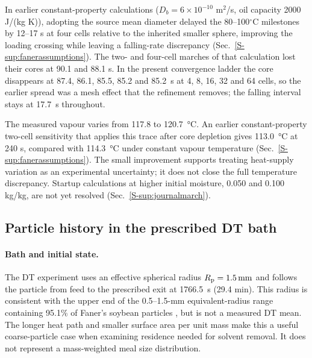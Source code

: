 In earlier constant-property calculations ($D_b=6\times10^{-10}$ m$^2$/s,
oil capacity 2000 J/(kg K)), adopting the source mean diameter delayed the
80--100$^\circ$C milestones by 12--17 s at four cells relative to the
inherited smaller sphere, improving the loading crossing while leaving a
falling-rate discrepancy (Sec.~\ref*{S-sup:fanerassumptions}). The
two- and four-cell marches of that calculation lost their cores at 90.1
and 88.1 s. In the present convergence ladder the core disappears at 87.4, 86.1, 85.5, 85.2 and 85.2~s at 4, 8,
16, 32 and 64 cells, so the earlier spread was a mesh effect that the
refinement removes; the falling interval stays at 17.7~s throughout.

The measured vapour varies from 117.8 to \SI{120.7}{\celsius}. An earlier
constant-property two-cell sensitivity that applies this trace after core
depletion gives \SI{113.0}{\celsius} at 240 s, compared with
\SI{114.3}{\celsius} under constant vapour temperature
(Sec.~\ref*{S-sup:fanerassumptions}). The small improvement supports treating
heat-supply variation as an experimental uncertainty; it does not close the
full temperature discrepancy.
Startup calculations at higher initial moisture, 0.050 and 0.100 kg/kg,
are not yet resolved (Sec.~\ref*{S-sup:journalmarch}).

\subsection{Particle history in the prescribed DT bath}
\label{sec:validation:dtmarch}\label{sec:validation:otherchecks}
\label{sec:validation:uptake}\label{sec:validation:tail}\label{sec:validation:bp}
\label{sec:validation:envelope}\label{sec:validation:rewetting}\label{sec:validation:derived}
\paragraph{Bath and initial state.}
The DT experiment uses an effective spherical radius $R_{\mathrm{p}}=\SI{1.5}{\milli\metre}$
and follows the particle from feed to the prescribed exit at
\SI{1766.5}{\second} (29.4 min). This radius is consistent with the upper end of the
0.5--1.5-mm equivalent-radius range containing 95.1\% of Faner's soybean
particles \citep{faner2019kinetics}, but is not a measured DT mean.
The longer heat path and smaller surface area per unit mass make this a
useful coarse-particle case when examining residence needed for solvent
removal. It does not represent a mass-weighted meal size distribution.

